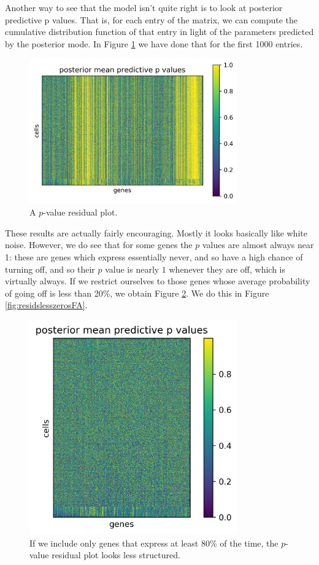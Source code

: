 Another way to see that the model isn't quite right is to look at posterior predictive p values.  That is, for each entry of the matrix, we can compute the cumulative distribution function of that entry in light of the parameters predicted by the posterior mode.  In Figure \ref{fig:resids} we have done that for the first 1000 entries.  

\begin{figure}
\includegraphics[width=0.8\textwidth]{pics/resids}
\caption{A $p$-value residual plot.\label{fig:resids}}
\end{figure}

These results are actually fairly encouraging.  Mostly it looks basically like white noise.  However, we do see that for some genes the $p$ values are almost always near 1: these are genes which express essentially never, and so have a high chance of turning off, and so their $p$ value is nearly $1$ whenever they are off, which is virtually always.  If we restrict ourselves to those genes whose average probability of going off is less than 20\%, we obtain Figure \ref{fig:residslesszeros}.  We do this in Figure \ref{fig:residslesszerosFA}.

\begin{figure}
\includegraphics[width=0.8\textwidth]{pics/residslesszeros}
\caption{If we include only genes that express at least 80\% of the time, the $p$-value residual plot looks less structured.\label{fig:residslesszeros}}
\end{figure}

